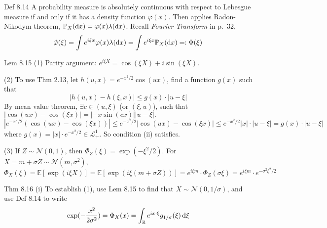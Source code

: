 \begin{note}{Def 8.14}
    A probability measure is absolutely continuous with respect to Lebesgue measure if and only if it has a density function $\varphi(x)$. Then applies Radon-Nikodym theorem, $\mathbb{P}_X(\mathop{}\!\mathrm{d} x)=\varphi(x)\lambda(\mathop{}\!\mathrm{d} x)$. Recall \emph{Fourier Transform} in p.~32,
    \[
    \hat{\varphi}(\xi)=\int e^{i\xi x}\varphi(x)\lambda(\mathop{}\!\mathrm{d} x)=\int e^{i\xi x}\mathbb{P}_X(\mathop{}\!\mathrm{d} x)=:\Phi(\xi)
    \]
\end{note}

\begin{note}{Lem 8.15}
    (1) Parity argument: $e^{i\xi X}=\cos(\xi X)+i\sin(\xi X)$.

    (2) To use Thm 2.13, let $h(u,x)=e^{-x^2/2}\cos(ux)$, find a function $g(x)$ such that 
    \[
    |h(u,x)-h(\xi,x)|\le g(x)\cdot |u-\xi|
    \]
    By mean value theorem, $\exists c\in(u,\xi)$ (or $(\xi,u)$), such that $|\cos(ux)-\cos(\xi x)|=|-x\sin(cx)||u-\xi|.$
    \[
    |e^{-x^2/2}(\cos(ux)-\cos(\xi x))|\le e^{-x^2/2}|\cos(ux)-\cos(\xi x)|\le e^{-x^2/2}|x|\cdot|u-\xi|=g(x)\cdot|u-\xi|
    \]
    where $g(x)=|x|\cdot e^{-x^2/2}\in\mathcal{L}^1_+$. So condition (ii) satisfies.

    (3) If $Z\sim \mathcal{N}(0,1)$, then $\Phi_Z(\xi)=\exp(-\xi^2/2)$. For $X=m+\sigma Z\sim \mathcal{N}(m,\sigma^2)$,
    \[
    \Phi_X(\xi)=\mathbb{E}[\exp(i\xi X)]=\mathbb{E}[\exp(i\xi (m+\sigma Z))]=e^{i\xi m}\cdot \Phi_Z(\sigma\xi)=e^{i\xi m}\cdot e^{-\sigma^2\xi^2/2}
    \]
\end{note}

\begin{note}{Thm 8.16}
    (i) To establish (1), use Lem 8.15 to find that $X\sim\mathcal{N}(0,1/\sigma)$, and use Def 8.14 to write
    \[
    \exp(-\frac{x^2}{2\sigma^2})= \Phi_X(x)= \int_{\mathbb{R}}e^{ix\cdot \xi}g_{1/\sigma}(\xi)\mathop{}\!\mathrm{d} \xi
    \]
\end{note}